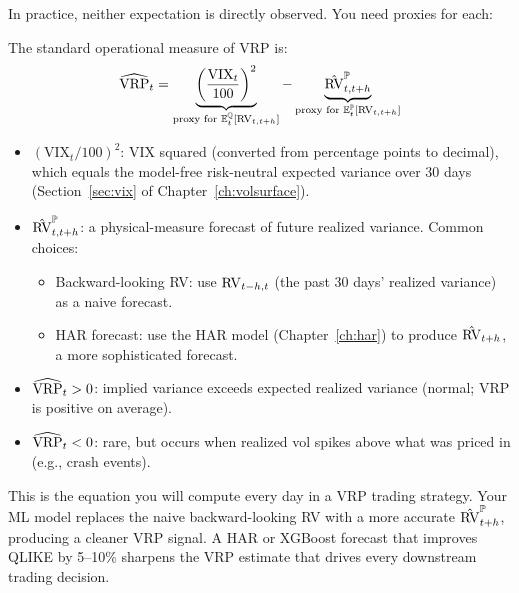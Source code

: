 In practice, neither expectation is directly observed.
You need proxies for each:

\begin{definition}
\label{def:vrp-operational}
The standard operational measure of VRP is:
\begin{equation}
  \widehat{\operatorname{VRP}}_t = \underbrace{\left(\frac{\text{VIX}_t}{100}\right)^2}_{\text{proxy for } \mathbb{E}^{\mathbb{Q}}_t[\operatorname{RV}_{t,t+h}]}
  - \underbrace{\hat{\operatorname{RV}}^{\mathbb{P}}_{t,t+h}}_{\text{proxy for } \mathbb{E}^{\mathbb{P}}_t[\operatorname{RV}_{t,t+h}]}
  \label{eq:vrp-operational}
\end{equation}
\begin{itemize}[nosep]
  \item $(\text{VIX}_t / 100)^2$: VIX squared (converted from percentage points to decimal), which equals the model-free risk-neutral expected variance over 30 days (Section~\ref{sec:vix} of Chapter~\ref{ch:volsurface}).
  \item $\hat{\operatorname{RV}}^{\mathbb{P}}_{t,t+h}$: a physical-measure forecast of future realized variance. Common choices:
    \begin{itemize}[nosep]
      \item Backward-looking RV: use $\operatorname{RV}_{t-h,t}$ (the past 30 days' realized variance) as a naive forecast.
      \item HAR forecast: use the HAR model (Chapter~\ref{ch:har}) to produce $\hat{\operatorname{RV}}_{t+h}$, a more sophisticated forecast.
    \end{itemize}
  \item $\widehat{\operatorname{VRP}}_t > 0$: implied variance exceeds expected realized variance (normal; VRP is positive on average).
  \item $\widehat{\operatorname{VRP}}_t < 0$: rare, but occurs when realized vol spikes above what was priced in (e.g., crash events).
\end{itemize}
\end{definition}

\begin{projectconnection}
This is the equation you will compute every day in a VRP trading strategy. Your ML model replaces the naive backward-looking RV with a more accurate $\hat{\operatorname{RV}}^{\mathbb{P}}_{t+h}$, producing a cleaner VRP signal. A HAR or XGBoost forecast that improves QLIKE by 5--10\% sharpens the VRP estimate that drives every downstream trading decision.
\end{projectconnection}

